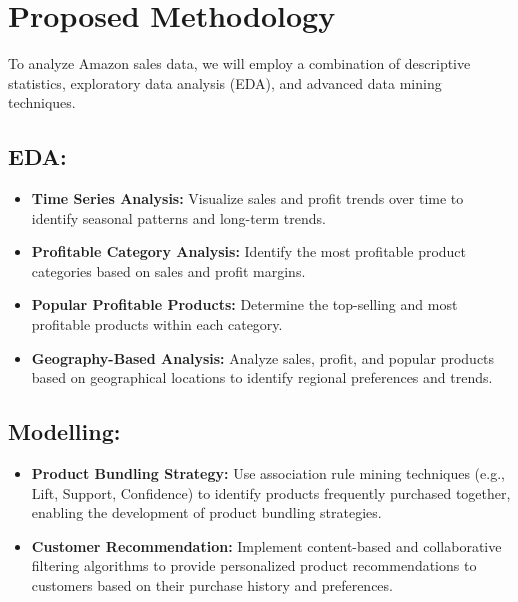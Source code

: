 \documentclass[11pt]{article} %
\begin{document}
\section{Proposed Methodology}
To analyze Amazon sales data, we will employ a combination of descriptive statistics, exploratory data analysis (EDA), and advanced data mining techniques.

\subsection*{EDA:}
\begin{itemize}
    \item \textbf{Time Series Analysis:} Visualize sales and profit trends over time to identify seasonal patterns and long-term trends.
    \item \textbf{Profitable Category Analysis:} Identify the most profitable product categories based on sales and profit margins.
    \item \textbf{Popular Profitable Products:} Determine the top-selling and most profitable products within each category.
    \item \textbf{Geography-Based Analysis:} Analyze sales, profit, and popular products based on geographical locations to identify regional preferences and trends.
\end{itemize}

\subsection*{Modelling:}
\begin{itemize}
    \item \textbf{Product Bundling Strategy:} Use association rule mining techniques (e.g., Lift, Support, Confidence) to identify products frequently purchased together, enabling the development of product bundling strategies.
    \item \textbf{Customer Recommendation:} Implement content-based and collaborative filtering algorithms to provide personalized product recommendations to customers based on their purchase history and preferences.
\end{itemize}
\clearpage
\end{document}
